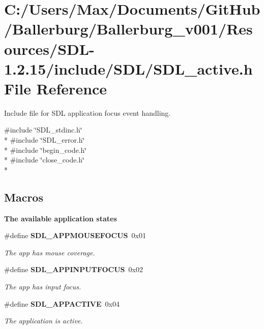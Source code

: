 \section{C\+:/\+Users/\+Max/\+Documents/\+Git\+Hub/\+Ballerburg/\+Ballerburg\+\_\+v001/\+Resources/\+S\+D\+L-\/1.2.15/include/\+S\+D\+L/\+S\+D\+L\+\_\+active.h File Reference}
\label{_s_d_l__active_8h}


Include file for S\+D\+L application focus event handling.  


{\ttfamily \#include \char`\"{}S\+D\+L\+\_\+stdinc.\+h\char`\"{}}\\*
{\ttfamily \#include \char`\"{}S\+D\+L\+\_\+error.\+h\char`\"{}}\\*
{\ttfamily \#include \char`\"{}begin\+\_\+code.\+h\char`\"{}}\\*
{\ttfamily \#include \char`\"{}close\+\_\+code.\+h\char`\"{}}\\*
\subsection*{Macros}
\begin{Indent}{\bf The available application states}\par
\begin{DoxyCompactItemize}
\item 
\#define {\bf S\+D\+L\+\_\+\+A\+P\+P\+M\+O\+U\+S\+E\+F\+O\+C\+U\+S}~0x01\label{_s_d_l__active_8h_adbb0da5a3196e16a2104a8dd4d048177}

\begin{DoxyCompactList}\small\item\em The app has mouse coverage. \end{DoxyCompactList}\item 
\#define {\bf S\+D\+L\+\_\+\+A\+P\+P\+I\+N\+P\+U\+T\+F\+O\+C\+U\+S}~0x02\label{_s_d_l__active_8h_ac41cbb6cae92292898f29b6e6338d5a6}

\begin{DoxyCompactList}\small\item\em The app has input focus. \end{DoxyCompactList}\item 
\#define {\bf S\+D\+L\+\_\+\+A\+P\+P\+A\+C\+T\+I\+V\+E}~0x04\label{_s_d_l__active_8h_a54820fe5c98fa3369dfad1f13c76cb4f}

\begin{DoxyCompactList}\small\item\em The application is active. \end{DoxyCompactList}\end{DoxyCompactItemize}
\end{Indent}
